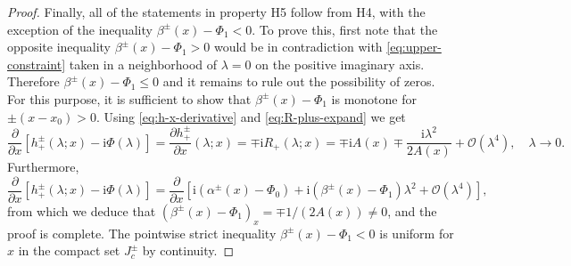\documentclass[12pt]{amsart}
\numberwithin{equation}{section}
\newcommand{\ii}{\mathrm{i}}
\newcommand{\SP}{\lambda}
\newcommand{\phaseint}{\Phi}
\newcommand{\bigo}[1]{ \mathcal{O}\! \left( #1 \right) }
\begin{document}
\begin{proof}
Finally, all of the statements in property H5 follow from H4, with the exception of the inequality $\beta^\pm(x)-\phaseint_1<0$.  To prove this, first note that the opposite inequality $\beta^\pm(x)-\phaseint_1>0$ would be in contradiction with \eqref{eq:upper-constraint} taken in a neighborhood of $\SP=0$ on the positive imaginary axis.  Therefore $\beta^\pm(x)-\phaseint_1\le 0$ and it remains to rule out the possibility of zeros.  For this purpose, it is sufficient to show that $\beta^\pm(x)-\phaseint_1$ is monotone for $\pm(x-x_0)>0$.  Using \eqref{eq:h-x-derivative}
and \eqref{eq:R-plus-expand} we get
\begin{equation}
\frac{\partial}{\partial x}\left[h^\pm_+(\SP;x)-\ii\phaseint(\SP)\right]=\frac{\partial h^\pm_+}{\partial x}(\SP;x)=\mp \ii R_+(\SP;x)=\mp \ii A(x)\mp\frac{\ii\SP^2}{2A(x)} + \bigo{\SP^4},\quad\SP\to 0.
\end{equation}
Furthermore,
\begin{equation}
\frac{\partial}{\partial x}\left[h^\pm_+(\SP;x)-\ii\phaseint(\SP)\right]=\frac{\partial}{\partial x}\left[\ii(\alpha^\pm(x)-\phaseint_0) + \ii(\beta^\pm(x)-\phaseint_1)\SP^2 + \bigo{\SP^4}\right],
\end{equation}
from which we deduce that $(\beta^\pm(x)-\phaseint_1)_x=\mp 1/(2A(x))\neq 0$, and the proof is complete.  The pointwise strict inequality $\beta^\pm(x)-\phaseint_1<0$ is uniform for $x$ in the compact set $J_c^\pm$ by continuity.
\end{proof}
\end{document}
